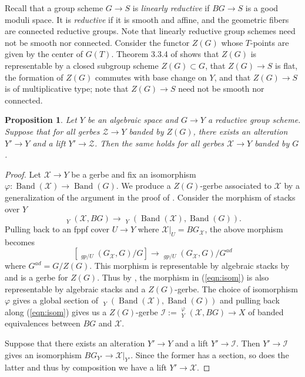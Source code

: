 \documentclass{amsart}
\newtheorem{proposition}[proposition]{Proposition}
\theoremstyle{definition}
\newcommand{\cX}{\mathcal{X}}
\newcommand{\sI}{\mathscr{I}}
\DeclareMathOperator{\Isom}{Isom}
\DeclareMathOperator{\uIsom}{\underline{\Isom}}
\DeclareMathOperator{\Band}{Band}
\begin{document}
	Recall that a group scheme $G\to S$ is \emph{linearly reductive} if $BG \to S$ is a good moduli space. It is \emph{reductive} if it is smooth and affine, and the geometric fibers are connected reductive groups. Note that linearly reductive group schemes need not be smooth nor connected. 
	Consider the functor $Z(G)$ whose $T$-points are given by the center of $G(T)$.
	Theorem 3.3.4 of \cite{ConradReductive} shows that $Z(G)$ is representable by a closed subgroup scheme $Z(G)\subset G$, that $Z(G)\to S$ is flat, the formation of $Z(G)$ commutes with base change on $Y$, and that $Z(G)\to S$ is of multiplicative type; note that $Z(G)\to S$ need not be smooth nor connected.
	
	\begin{proposition}\label{prop:gerbe-abelian}
		Let $Y$ be an algebraic space and $G\to Y$ a reductive group scheme. Suppose that for all gerbes $\mathcal{Z} \to Y$ banded by $Z(G)$, there exists an alteration $Y' \to Y$ and a lift $Y' \to \mathcal{Z}$. Then the same holds for all gerbes $\cX \to Y$ banded by $G$. 
		
	\end{proposition}
	\begin{proof}
		Let $\cX \to Y$ be a gerbe and fix an isomorphism $\varphi \colon \Band(\cX) \to \Band(G)$. We produce a $Z(G)$-gerbe associated to $\cX$ by a generalization of the argument in the proof of \cite[Theorem 58]{sid}. Consider the morphism of stacks over $Y$ 
		\begin{equation}\label{eqn:isom}
			\uIsom_Y(\cX, BG) \to \uIsom_Y(\Band(\cX), \Band(G)).
		\end{equation}
		Pulling back to an fppf cover $U \to Y$ where $\cX|_U = BG_{\cX}$, the above morphism becomes 
		$$
		[\uIsom_{gp/U}(G_{\cX}, G)/G] \to \uIsom_{gp/U}(G_{\cX},G)/G^{ad}
		$$
		where $G^{ad} = G/Z(G)$. This morphism is representable by algebraic stacks by \cite[Cor. XXIV 1.8]{SGA3} and is a gerbe for $Z(G)$. Thus by \cite[Tag 06DB]{stacks-project}, the morphism in (\ref{eqn:isom}) is also representable by algebraic stacks and a $Z(G)$-gerbe. The choice of isomorphism $\varphi$ gives a global section of $\uIsom_Y(\Band(\cX), \Band(G))$ and pulling back along (\ref{eqn:isom}) gives us a $Z(G)$-gerbe $\sI :=\uIsom_Y^{\varphi}(\cX, BG) \to X$ of banded equivalences between $BG$ and $\cX$.
		
		Suppose that there exists an alteration $Y' \to Y$ and a lift $Y' \to \sI$. Then $Y' \to \sI$ gives an isomorphism $BG_{Y'} \to \cX|_{Y'}$. Since the former has a section, so does the latter and thus by composition we have a lift $Y' \to \cX$. 
		
	\end{proof}
	
\end{document}
